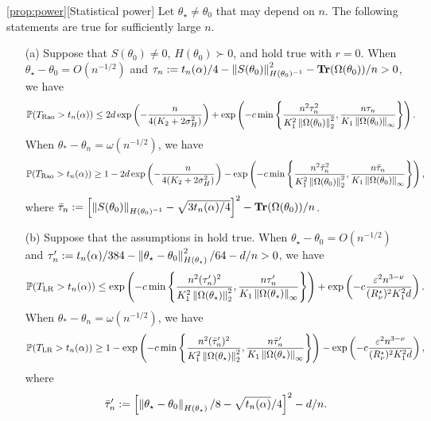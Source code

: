 \begin{customprop}{\ref{prop:power}}[Statistical power]
    Let $\theta_\star \neq \theta_0$ that may depend on $n$.
    The following statements are true for sufficiently large $n$.
    \begin{enumerate}
        \item[(a)] Suppose that $S(\theta_0) \neq 0$, $H(\theta_0) \succ 0$, and  hold true with $r=0$.
        When $\theta_\star - \theta_0 = O(n^{-1/2})$ and $\tau_n := t_n(\alpha)/4 - \left\lVert S(\theta_0) \right\rVert_{H(\theta_0)^{-1}}^2 - \operatorname{\bf Tr}(\Omega(\theta_0))/n > 0$, we have
        \begin{align*}
            \operatorname{\mathbb P}(T_{\text{Rao}} > t_n(\alpha)) &\le 2d \exp\left( - \frac{n}{4(K_2 + 2\sigma_H^2)} \right) + \exp\left( -c\min\left\{ \frac{n^2 \tau_n^2}{K_1^2 \left\lVert \Omega(\theta_0) \right\rVert_2^2}, \frac{n\tau_n}{K_1 \left\lVert \Omega(\theta_0) \right\rVert_\infty} \right\} \right).
        \end{align*}
        When $\theta_* - \theta_n = \omega(n^{-1/2})$, we have
        \begin{align*}
            \operatorname{\mathbb P}(T_{\text{Rao}} > t_n(\alpha)) \ge 1 - 2d \exp\left( - \frac{n}{4(K_2 + 2\sigma_H^2)} \right) - \exp\left( -c\min\left\{ \frac{n^2 \bar \tau_n^2}{K_1^2 \left\lVert \Omega(\theta_0) \right\rVert_2^2}, \frac{n\bar \tau_n}{K_1 \left\lVert \Omega(\theta_0) \right\rVert_\infty} \right\} \right),
        \end{align*}
        where $\bar \tau_n := \left[ \left\lVert S(\theta_0) \right\rVert_{H(\theta_0)^{-1}} - \sqrt{3t_n(\alpha)/4} \right]^2 - \operatorname{\bf Tr}(\Omega(\theta_0))/n$.
        
        \item[(b)] Suppose that the assumptions in  hold true.
        When $\theta_\star - \theta_0 = O(n^{-1/2})$ and $\tau_n' := t_n(\alpha)/384 - \left\lVert \theta_\star - \theta_0 \right\rVert_{H(\theta_\star)}^2/64 - d/n > 0$, we have
        \begin{align*}
            \operatorname{\mathbb P}(T_{\text{LR}} > t_n(\alpha))
            \le \exp\left( -c\min\left\{ \frac{n^2 (\tau_n')^2}{K_1^2 \left\lVert \Omega(\theta_\star) \right\rVert_2^2}, \frac{n\tau_n'}{K_1 \left\lVert \Omega(\theta_\star) \right\rVert_\infty} \right\} \right) + \exp\left(-c \frac{\varepsilon^2 n^{3-\nu}}{(R_\nu^\star)^2 K_1^2 d} \right).
        \end{align*}
        When $\theta_* - \theta_n = \omega(n^{-1/2})$, we have
        \begin{align*}
            \operatorname{\mathbb P}(T_{\text{LR}} > t_n(\alpha)) \ge 1 - \exp\left( -c\min\left\{ \frac{n^2 (\bar \tau_n')^2}{K_1^2 \left\lVert \Omega(\theta_\star) \right\rVert_2^2}, \frac{n\bar \tau_n'}{K_1 \left\lVert \Omega(\theta_\star) \right\rVert_\infty} \right\} \right) - \exp\left(-c \frac{\varepsilon^2 n^{3-\nu}}{(R_\nu^\star)^2 K_1^2 d} \right),
        \end{align*}
        where
        \begin{align*}
            \bar \tau_n' := \left[ \left\lVert \theta_\star - \theta_0 \right\rVert_{H(\theta_\star)}/8 - \sqrt{t_n(\alpha)}/4 \right]^2 - d/n.
        \end{align*}
        

\end{enumerate}
\end{customprop}
